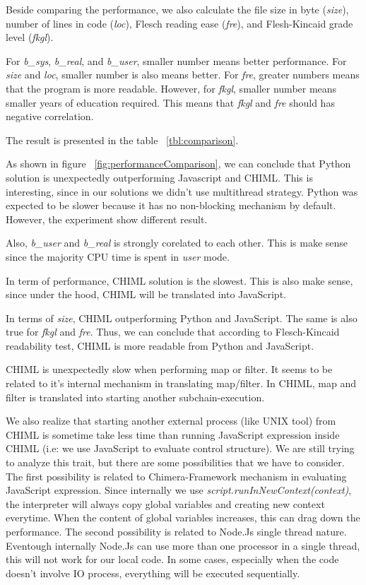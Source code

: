 \documentclass[conference]{IEEEtran}
\begin{document}
Beside comparing the performance, we also calculate the file size in byte ({\it size}), number of lines in code ({\it loc}), Flesch reading ease ({\it fre}), and Flesh-Kincaid grade level ({\it fkgl}).

For {\it b\_sys}, {\it b\_real}, and {\it b\_user}, smaller number means better performance. For {\it size} and {\it loc}, smaller number is also means better. For {\it fre}, greater numbers means that the program is more readable. However, for {\it fkgl}, smaller number means smaller years of education required. This means that {\it fkgl} and {\it fre} should has negative correlation.

The result is presented in the table ~\ref{tbl:comparison}.

As shown in figure ~\ref{fig:performanceComparison}, we can conclude that Python solution is unexpectedly outperforming Javascript and CHIML. This is interesting, since in our solutions we didn't use multithread strategy. Python was expected to be slower because it has no non-blocking mechanism by default. However, the experiment show different result.

Also, {\it b\_user} and {\it b\_real} is strongly corelated to each other. This is make sense since the majority CPU time is spent in {\it user} mode.

In term of performance, CHIML solution is the slowest. This is also make sense, since under the hood, CHIML will be translated into JavaScript. 

In terms of {\it size}, CHIML outperforming Python and JavaScript. The same is also true for {\it fkgl} and {\it fre}. Thus, we can conclude that according to Flesch-Kincaid readability test, CHIML is more readable from Python and JavaScript.

CHIML is unexpectedly slow when performing map or filter. It seems to be related to it's internal mechanism in translating map/filter. In CHIML, map and filter is translated into starting another subchain-execution.

We also realize that starting another external process (like UNIX tool) from CHIML is sometime take less time than running JavaScript expression inside CHIML (i.e: we use JavaScript to evaluate control structure). We are still trying to analyze this trait, but there are some possibilities that we have to consider. The first possibility is related to Chimera-Framework mechanism in evaluating JavaScript expression. Since internally we use {\it script.runInNewContext(context)}, the interpreter will always copy global variables and creating new context everytime. When the content of global variables increases, this can drag down the performance. The second possibility is related to Node.Js single thread nature. Eventough internally Node.Js can use more than one processor in a single thread, this will not work for our local code. In some cases, especially when the code doesn't involve IO process, everything will be executed sequentially.
\end{document}
